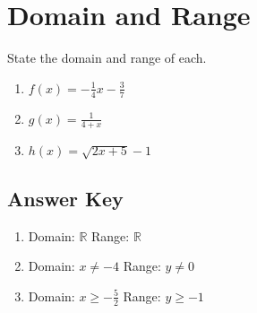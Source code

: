 \chapter{Domain and Range}

State the domain and range of each.

\begin{multicols}{3}
\begin{enumerate}
	\item $f(x) = -\frac{1}{4}x - \frac{3}{7}$
	\item $g(x) = \frac{1}{4+x}$
	\item $h(x) = \sqrt{2x+5} - 1$
\end{enumerate}	\setcounter{Review}{\value{enumi}}
\end{multicols}

\newpage

\section{Answer Key}

\begin{enumerate}
    \item Domain: $\mathbb{R}$ \quad Range: $\mathbb{R}$
    \item Domain: $x \neq -4$ \quad Range: $y \neq 0$
    \item Domain: $x \geq -\frac{5}{2}$ \quad Range: $y \geq -1$
\end{enumerate}